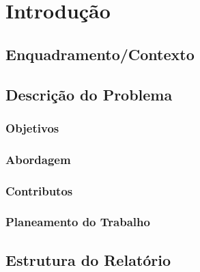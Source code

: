 \chapter{Introdução} 	
\label{sec:1-Introducao} %



\section{Enquadramento/Contexto}



\section{Descrição do Problema}



\subsection{Objetivos}
\label{sec:1-obj}



\subsection{Abordagem}



\subsection{Contributos}



\subsection{Planeamento do Trabalho}


\section{Estrutura do Relatório}

